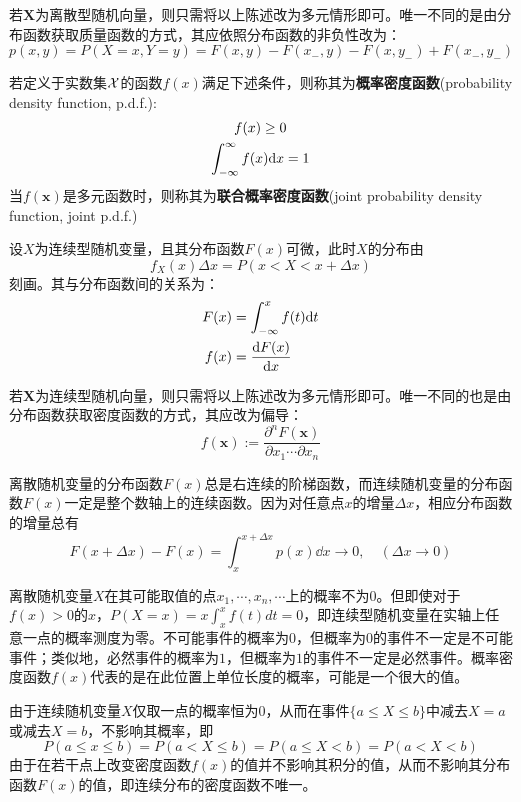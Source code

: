 若$\mathbf{X}$为离散型随机向量，则只需将以上陈述改为多元情形即可。唯一不同的是由分布函数获取质量函数的方式，其应依照分布函数的非负性改为：
\[ p(x,y)=P(X=x,Y=y)=F(x, y)-F(x_-, y)-F(x, y_-)+ F(x_-, y_-) \]

\begin{definition}[概率密度函数]
    若定义于实数集$\mathcal{X}$的函数$f(x)$满足下述条件，则称其为\textbf{概率密度函数}(probability density function, p.d.f.):
    \begin{gather*}
        f(x) \ge 0 \\
        \int_{-\infty}^{\infty}f(x) \mathrm{d} x=1
    \end{gather*}
    当$f(\mathbf{x})$是多元函数时，则称其为\textbf{联合概率密度函数}(joint probability density function, joint p.d.f.)
\end{definition}

设$X$为连续型随机变量，且其分布函数$F(x)$可微，此时$X$的分布由
\[ f_{X}(x)\Delta x = P(x<X<x+\Delta x) \]
刻画。其与分布函数间的关系为：
\begin{align*}
    F(x) & = \int_{-\infty}^x f(t)\mathrm{d} t          \\
    f(x) & = \frac{\mathrm{d}F(x)}{\mathrm{d}x}
\end{align*}

若$\mathbf{X}$为连续型随机向量，则只需将以上陈述改为多元情形即可。唯一不同的也是由分布函数获取密度函数的方式，其应改为偏导：
\[ f(\mathbf{x}) := \frac{\partial^{n} F(\mathbf{x})}{\partial x_1 \cdots \partial x_n} \]

离散随机变量的分布函数$F(x)$总是右连续的阶梯函数，而连续随机变量的分布函数$F(x)$一定是整个数轴上的连续函数。因为对任意点$x$的增量$\Delta x$，相应分布函数的增量总有
\[ F(x+\Delta x)-F(x)=\int_{x}^{x+\Delta x} p(x) \dd  x \longrightarrow 0, \quad(\Delta x \rightarrow 0) \]

离散随机变量$X$在其可能取值的点$x_1, \cdots, x_n, \cdots$上的概率不为$0$。但即使对于$f(x)>0$的$x$，$P(X=x)=x\int_{x}^x f(t)dt=0$，即连续型随机变量在实轴上任意一点的概率测度为零。不可能事件的概率为$0$，但概率为$0$的事件不一定是不可能事件；类似地，必然事件的概率为$1$，但概率为$1$的事件不一定是必然事件。概率密度函数$f(x)$代表的是在此位置上单位长度的概率，可能是一个很大的值。

由于连续随机变量$X$仅取一点的概率恒为$0$，从而在事件$\{ a \le X \le b \}$中减去$X=a$或减去$X=b$，不影响其概率，即
\[ P(a \le x \le b)=P(a<X \le b)=P(a \le X<b)=P(a<X<b) \]
由于在若干点上改变密度函数$f(x)$的值并不影响其积分的值，从而不影响其分布函数$F(x)$的值，即连续分布的密度函数不唯一。


